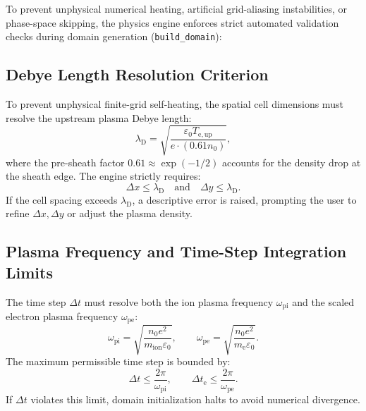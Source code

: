 \documentclass[11pt,a4paper]{article}
\begin{document}
To prevent unphysical numerical heating, artificial grid-aliasing instabilities, or phase-space skipping, the physics engine enforces strict automated validation checks during domain generation (\texttt{build\_domain}):

\subsection{Debye Length Resolution Criterion}
To prevent unphysical finite-grid self-heating, the spatial cell dimensions must resolve the upstream plasma Debye length:
\begin{equation}
    \lambda_{\mathrm{D}} = \sqrt{\frac{\varepsilon_0 T_{\mathrm{e,up}}}{e \cdot (0.61 n_0)}},
\end{equation}
where the pre-sheath factor $0.61 \approx \exp(-1/2)$ accounts for the density drop at the sheath edge. The engine strictly requires:
\begin{equation}
    \Delta x \le \lambda_{\mathrm{D}} \quad \text{and} \quad \Delta y \le \lambda_{\mathrm{D}}.
\end{equation}
If the cell spacing exceeds $\lambda_{\mathrm{D}}$, a descriptive error is raised, prompting the user to refine $\Delta x, \Delta y$ or adjust the plasma density.

\subsection{Plasma Frequency and Time-Step Integration Limits}
The time step $\Delta t$ must resolve both the ion plasma frequency $\omega_{\mathrm{pi}}$ and the scaled electron plasma frequency $\omega_{\mathrm{pe}}$:
\begin{equation}
    \omega_{\mathrm{pi}} = \sqrt{\frac{n_0 e^2}{m_{\mathrm{ion}} \varepsilon_0}}, \qquad
    \omega_{\mathrm{pe}} = \sqrt{\frac{n_0 e^2}{m_{\mathrm{e}} \varepsilon_0}}.
\end{equation}
The maximum permissible time step is bounded by:
\begin{equation}
    \Delta t \le \frac{2\pi}{\omega_{\mathrm{pi}}}, \qquad \Delta t_{\mathrm{e}} \le \frac{2\pi}{\omega_{\mathrm{pe}}}.
\end{equation}
If $\Delta t$ violates this limit, domain initialization halts to avoid numerical divergence.
\end{document}
